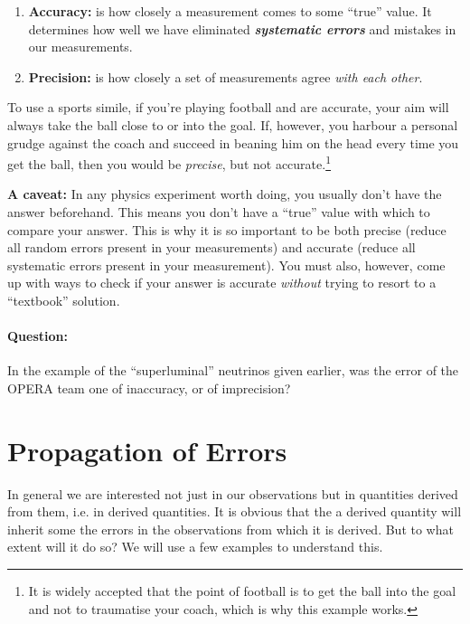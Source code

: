 \begin{enumerate}
    \item \textbf{Accuracy:} is how closely a measurement comes to some ``true'' value. It determines how well we have eliminated \textbf{\textit{systematic errors}} and mistakes in our measurements.
    \item \textbf{Precision:} is how closely a set of measurements agree \textit{with each other}. %
\end{enumerate}

To use a sports simile, if you're playing football and are accurate, your aim will always take the ball close to or into the goal. If, however, you harbour a personal grudge against the coach and succeed in beaning him on the head every time you get the ball, then you would be \textit{precise}, but not accurate.\footnote{It is widely accepted that the point of football is to get the ball into the goal and not to traumatise your coach, which is why this example works.}

\textbf{A caveat:} In any physics experiment worth doing, you usually don't have the answer beforehand. This means you don't have a ``true'' value with which to compare your answer. This is why it is so important to be both precise (reduce all random errors present in your measurements) and accurate (reduce all systematic errors present in your measurement). You must also, however, come up with ways to check if your answer is accurate \textit{without} trying to resort to a ``textbook'' solution.

\begin{question}
\paragraph{Question:} In the example of the ``superluminal'' neutrinos given earlier, was the error of the OPERA team one of inaccuracy, or of imprecision? 
\end{question}

\section{Propagation of Errors}

In general we are interested not just in our observations but in quantities derived from them, i.e. in derived quantities. It is obvious that the a derived quantity will inherit some the errors in the observations from which it is derived. But to what extent will it do so? We will use a few examples to understand this. 

